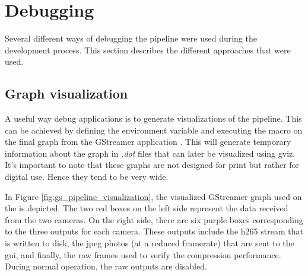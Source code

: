 \section{Debugging}
Several different ways of debugging the \gs pipeline were used during the development process.
This section describes the different approaches that were used.

\subsection{Graph visualization}
A useful way debug \gs applications is to generate visualizations of the pipeline.
This can be achieved by defining the environment variable  and executing the  macro on the final graph from the GStreamer application
\cite{johnstonGeneratingGStreamerPipeline2018}.
This will generate temporary information about the graph in \textit{.dot} files that can later be visualized using \gls{gviz}.
It's important to note that these graphs are not designed for print but rather for digital use. Hence they tend to be very wide.

In Figure \ref{fig:gs_pipeline_visualization}, the visualized GStreamer graph used on the \sr is depicted.
The two red boxes on the left side represent the data received from the two cameras.
On the right side, there are six purple boxes corresponding to the three outputs for each camera.
These outputs include the \gls{h265} stream that is written to disk, the \gls{jpeg} photos (at a reduced framerate) that are sent to the \gls{gui}, and finally, the raw frames used to verify the compression performance.
During normal operation, the raw outputs are disabled.

